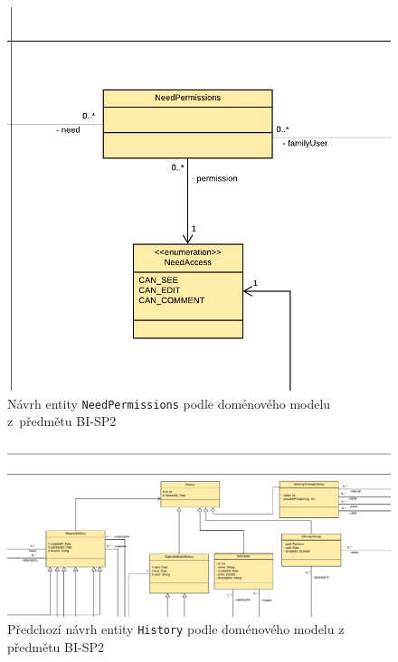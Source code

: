           \begin{figure}\centering
	        \includegraphics[width=1.0\textwidth]{pdfs/NeedPermissions1}
	        \caption[Návrh entity \texttt{NeedPermissions}]{Návrh entity \texttt{NeedPermissions} podle doménového modelu z~předmětu BI-SP2}\label{image:NeedPermissions1}
        \end{figure}
    \begin{figure}\centering
        \includegraphics[angle=90, height=0.9\textheight]{pdfs/History1}
        \caption[Předešlý návrh entity \texttt{History}]{Předchozí návrh entity \texttt{History} podle doménového modelu z předmětu BI-SP2}\label{image:History1}
    \end{figure}
